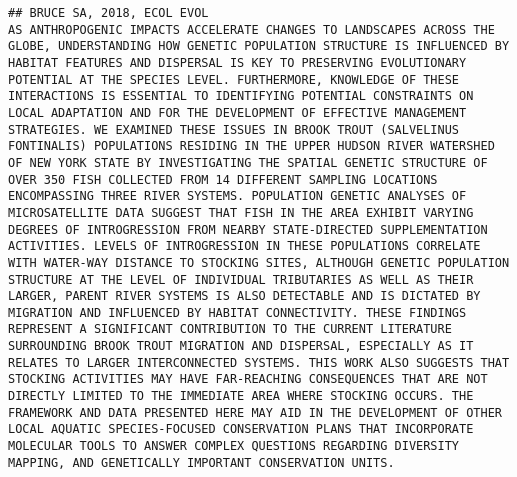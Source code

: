 \documentclass[]{article}
\begin{document}
\begin{verbatim}
## BRUCE SA, 2018, ECOL EVOL                                                                                                                                                                                                                                                                                                                                                                                                                                                       AS ANTHROPOGENIC IMPACTS ACCELERATE CHANGES TO LANDSCAPES ACROSS THE GLOBE, UNDERSTANDING HOW GENETIC POPULATION STRUCTURE IS INFLUENCED BY HABITAT FEATURES AND DISPERSAL IS KEY TO PRESERVING EVOLUTIONARY POTENTIAL AT THE SPECIES LEVEL. FURTHERMORE, KNOWLEDGE OF THESE INTERACTIONS IS ESSENTIAL TO IDENTIFYING POTENTIAL CONSTRAINTS ON LOCAL ADAPTATION AND FOR THE DEVELOPMENT OF EFFECTIVE MANAGEMENT STRATEGIES. WE EXAMINED THESE ISSUES IN BROOK TROUT (SALVELINUS FONTINALIS) POPULATIONS RESIDING IN THE UPPER HUDSON RIVER WATERSHED OF NEW YORK STATE BY INVESTIGATING THE SPATIAL GENETIC STRUCTURE OF OVER 350 FISH COLLECTED FROM 14 DIFFERENT SAMPLING LOCATIONS ENCOMPASSING THREE RIVER SYSTEMS. POPULATION GENETIC ANALYSES OF MICROSATELLITE DATA SUGGEST THAT FISH IN THE AREA EXHIBIT VARYING DEGREES OF INTROGRESSION FROM NEARBY STATE-DIRECTED SUPPLEMENTATION ACTIVITIES. LEVELS OF INTROGRESSION IN THESE POPULATIONS CORRELATE WITH WATER-WAY DISTANCE TO STOCKING SITES, ALTHOUGH GENETIC POPULATION STRUCTURE AT THE LEVEL OF INDIVIDUAL TRIBUTARIES AS WELL AS THEIR LARGER, PARENT RIVER SYSTEMS IS ALSO DETECTABLE AND IS DICTATED BY MIGRATION AND INFLUENCED BY HABITAT CONNECTIVITY. THESE FINDINGS REPRESENT A SIGNIFICANT CONTRIBUTION TO THE CURRENT LITERATURE SURROUNDING BROOK TROUT MIGRATION AND DISPERSAL, ESPECIALLY AS IT RELATES TO LARGER INTERCONNECTED SYSTEMS. THIS WORK ALSO SUGGESTS THAT STOCKING ACTIVITIES MAY HAVE FAR-REACHING CONSEQUENCES THAT ARE NOT DIRECTLY LIMITED TO THE IMMEDIATE AREA WHERE STOCKING OCCURS. THE FRAMEWORK AND DATA PRESENTED HERE MAY AID IN THE DEVELOPMENT OF OTHER LOCAL AQUATIC SPECIES-FOCUSED CONSERVATION PLANS THAT INCORPORATE MOLECULAR TOOLS TO ANSWER COMPLEX QUESTIONS REGARDING DIVERSITY MAPPING, AND GENETICALLY IMPORTANT CONSERVATION UNITS.

\end{verbatim}
\end{document}
